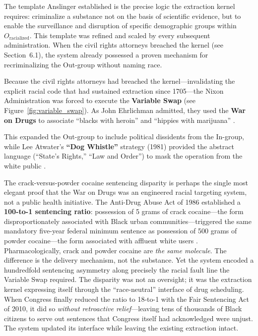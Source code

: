 \documentclass[12pt,openany]{book}
\begin{document}
The template Anslinger established is the precise logic the extraction kernel requires: criminalize a substance not on the basis of scientific evidence, but to enable the surveillance and disruption of specific demographic groups within $O_{\text{racialized}}$. This template was refined and scaled by every subsequent administration. When the civil rights attorneys breached the kernel (see Section~6.1), the system already possessed a proven mechanism for recriminalizing the Out-group without naming race.

Because the civil rights attorneys had breached the kernel---invalidating the explicit racial code that had sustained extraction since 1705---the Nixon Administration was forced to execute the \textbf{Variable Swap} (see Figure~\ref{fig:variable_swap}). As John Ehrlichman admitted, they used the \textbf{War on Drugs} to associate ``blacks with heroin'' and ``hippies with marijuana'' \cite{baum, vera, alexander, webb}.

This expanded the Out-group to include political dissidents from the In-group, while Lee Atwater's \textbf{``Dog Whistle''} strategy (1981) provided the abstract language (``State's Rights,'' ``Law and Order'') to mask the operation from the white public \cite{lopez, phillips}.

The crack-versus-powder cocaine sentencing disparity is perhaps the single most elegant proof that the War on Drugs was an engineered racial targeting system, not a public health initiative. The Anti-Drug Abuse Act of 1986 established a \textbf{100-to-1 sentencing ratio}: possession of 5 grams of crack cocaine---the form disproportionately associated with Black urban communities---triggered the same mandatory five-year federal minimum sentence as possession of 500 grams of powder cocaine---the form associated with affluent white users \cite{alexander}. Pharmacologically, crack and powder cocaine are \textit{the same molecule}. The difference is the delivery mechanism, not the substance. Yet the system encoded a hundredfold sentencing asymmetry along precisely the racial fault line the Variable Swap required. The disparity was not an oversight; it was the extraction kernel expressing itself through the ``race-neutral'' interface of drug scheduling. When Congress finally reduced the ratio to 18-to-1 with the Fair Sentencing Act of 2010, it did so \textit{without retroactive relief}---leaving tens of thousands of Black citizens to serve out sentences that Congress itself had acknowledged were unjust. The system updated its interface while leaving the existing extraction intact.
\end{document}
